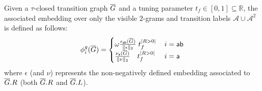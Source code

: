 \begin{definition}[G-Embedding]\label{def:ppne}
	
Given a $\tau$-closed transition graph $\overline{G}$ and a tuning parameter $t_f\in[0,1]\subseteq\mathbb{R}$, the associated embedding over only the visible $2$-grams and transition labels $\mathcal{A}\cup\mathcal{A}^2$ is defined as follows:
$$\phi^{g}_{i}(\overline{G})=\begin{cases}
	\omega \frac{\epsilon_{\mathsf{ab}}(\overline{G})}{\|\epsilon\|_2}\;t_f^{|R>0|}\, & {i}=\mathsf{ab}\\
	\frac{\nu_{\mathsf{a}}(\overline{G})}{\|\nu\|_2}\;\;\;\,t_f^{|R>0|}\, & {i}=\mathsf{a}\\
\end{cases}$$
where $\epsilon$ (and $\nu$) represents the non-negatively defined embedding associated to $\overline{G}.R$ (both $\overline{G}.R$ and $\overline{G}.L$).
\end{definition}

